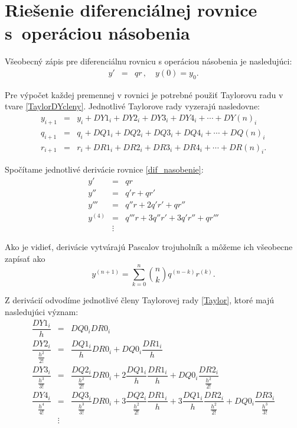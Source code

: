 \section{Riešenie diferenciálnej rovnice s~operáciou násobenia}
Všeobecný zápis pre diferenciálnu rovnicu s operáciou násobenia je nasledujúci:
\begin{eqnarray}
y' & = & qr \, , \quad y(0) = y_{0} . \label{dif_nasobenie}
\end{eqnarray}

Pre výpočet každej premennej v rovnici je potrebné použiť Taylorovu radu v tvare \eqref{TaylorDYcleny}. Jednotlivé Taylorove rady vyzerajú nasledovne:
\begin{eqnarray}
y_{i + 1} & = & y_{i} + DY1_{i} + DY2_{i} + DY3_{i} + DY4_{i} + \cdots + DY(n)_{i}\\
q_{i+1} & = & q_i + DQ1_i + DQ2_i + DQ3_i + DQ4_i + \cdots + DQ(n)_i\\
r_{i+1} & = & r_i + DR1_i + DR2_i + DR3_i + DR4_i + \cdots + DR(n)_i .
\end{eqnarray}


Spočítame jednotlivé derivácie rovnice \eqref{dif_nasobenie}:
\begin{eqnarray}
y' & = & qr \nonumber \\
y'' & = & q'r + qr' \nonumber \\
y''' & = & q''r + 2q'r' + qr'' \nonumber \\
y^{(4)} & = & q'''r + 3q''r'+ 3q'r'' + qr''' \nonumber \\
 & \vdots \nonumber &
\end{eqnarray}


Ako je vidieť, derivácie vytvárajú Pascalov trojuholník a môžeme ich všeobecne zapísať ako
\begin{equation}
y^{(n+1)} = \sum_{k=0}^n \binom{n}{k} q^{(n-k)} r^{(k)} . \nonumber
\end{equation}
\bigskip

Z derivácií odvodíme jednotlivé členy Taylorovej rady \eqref{Taylor}, ktoré majú nasledujúci význam:
\begin{eqnarray}
\dfrac{DY1_{i}}{h} & = & DQ0_i DR0_i \\
\dfrac{DY2_{i}}{\frac{h^{2}}{2!}} & = & \dfrac{DQ1_i}{h} DR0_i + DQ0_i \dfrac{DR1_i}{h} \nonumber \\
\dfrac{DY3_{i}}{\frac{h^{3}}{3!}} & = & \dfrac{DQ2_i}{\frac{h^{2}}{2!}} DR0_i + 2 \dfrac{DQ1_i}{h} \dfrac{DR1_i}{h} + DQ0_i \dfrac{DR2_i}{\frac{h^{2}}{2!}} \nonumber \\
\dfrac{DY4_{i}}{\frac{h^{4}}{4!}} & = & \dfrac{DQ3_i}{\frac{h^{3}}{3!}} DR0_i + 3 \dfrac{DQ2_i}{\frac{h^{2}}{2!}} \dfrac{DR1_i}{h} + 3 \dfrac{DQ1_i}{h} \dfrac{DR2_i}{\frac{h^{2}}{2!}} + DQ0_i \dfrac{DR3_i}{\frac{h^{3}}{3!}} \nonumber \\
& \vdots \nonumber & 
\end{eqnarray}



